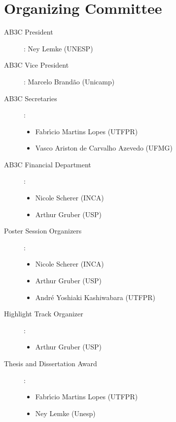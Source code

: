 
\chapter{Organizing Committee}

\begin{description}

 \item[AB3C President]: Ney Lemke (UNESP)

\item[AB3C Vice President]: Marcelo Brand\~ao (Unicamp) 

  
\item[AB3C Secretaries]:

\begin{itemize}
 \item Fabr\'{\i}cio Martins Lopes  (UTFPR)
 \item Vasco Ariston de Carvalho Azevedo (UFMG)
\end{itemize}

\item[AB3C Financial Department]:

\begin{itemize}
\item Nicole Scherer (INCA) 
\item Arthur Gruber (USP)
\end{itemize}


\item[Poster Session Organizers]:

\begin{itemize}
\item Nicole Scherer (INCA) 
\item Arthur Gruber (USP)
\item André Yoshiaki Kashiwabara (UTFPR)

\end{itemize}

\item[Highlight Track Organizer]:
\begin{itemize}
\item Arthur Gruber (USP)
\end{itemize} 

\item[Thesis and Dissertation Award]:
  \begin{itemize}
 \item Fabr\'{\i}cio Martins Lopes  (UTFPR)
    \item Ney Lemke (Unesp)
\end{itemize} 
\end{description}


